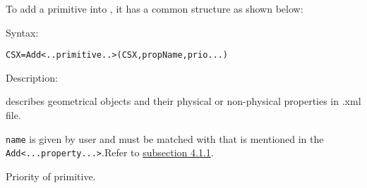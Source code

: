 To add a primitive into \hyperref[CSX]{}, it has a common structure as shown below:

\begin{FontDescr}{Syntax:}
\begin{lstlisting} 
CSX=Add<..primitive..>(CSX,propName,prio...)
\end{lstlisting} 
\end{FontDescr}

\begin{FontDescr}{Description:}
 \label{CSX}
\begin{myindentpar}
 describes geometrical objects and their physical or non-physical properties in .xml file.
\end{myindentpar}

\begin{myindentpar}
\texttt{name} is given by user and must be matched with that is mentioned in the \texttt{Add<...property...>}.Refer to \hyperref[subsection_gprop_setup]{subsection 4.1.1}.  
\end{myindentpar}

\begin{myindentpar}
Priority of primitive.    
\end{myindentpar}
\end{FontDescr}


